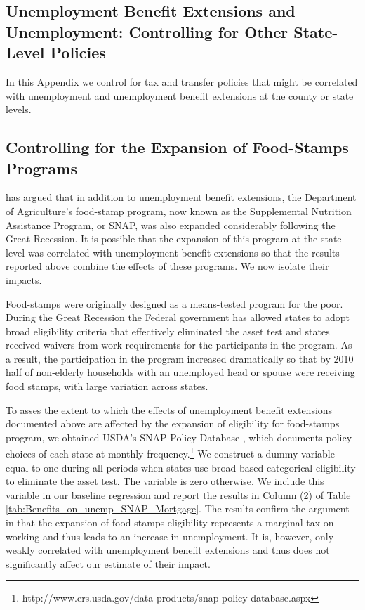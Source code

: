 \documentclass[12pt]{article}
\newcommand{\1}{\mathbf{1}}
\begin{document}
\begin{appendix}
\FloatBarrier

\section{Unemployment Benefit Extensions and Unemployment: Controlling for Other State-Level Policies}
\label{app:benefits_and_unemployment_state_policies}

In this Appendix we control for tax and transfer policies that might be correlated with unemployment and unemployment benefit extensions at the county or state levels.


\subsection{Controlling for the Expansion of Food-Stamps Programs}


\citet{mulligan:12} has argued that in addition to unemployment benefit extensions, the Department of Agriculture's food-stamp program, now known as the Supplemental Nutrition Assistance Program, or SNAP, was also expanded considerably following the Great Recession. It is possible that the expansion of this program at the state level was correlated with unemployment benefit extensions so that the results reported above combine the effects of these programs. We now isolate their impacts.

Food-stamps were originally designed as a means-tested program for the poor. During the Great Recession the Federal government has allowed states to adopt  broad eligibility criteria that effectively eliminated the asset test and states received waivers from work requirements for the participants in the program. As a result, the participation in the program increased dramatically so that by 2010 half of non-elderly households with an unemployed head or spouse were receiving food stamps, with large variation across states.

To asses the extent to which the effects of unemployment benefit extensions documented above are affected by the expansion of eligibility for food-stamps program, we obtained USDA's SNAP Policy Database \citep{data:usda-snap-policy}, which documents policy choices of each state at monthly frequency.\footnote{http://www.ers.usda.gov/data-products/snap-policy-database.aspx} We construct a dummy variable equal to one during all periods when states use broad-based categorical eligibility to eliminate the asset test. The variable is zero otherwise. We include this variable in our baseline regression and report the results in Column (2) of Table \ref{tab:Benefits_on_unemp_SNAP_Mortgage}. The results confirm the argument in \citet{mulligan:12} that the expansion of food-stamps eligibility represents a marginal tax on working and thus leads to an increase in unemployment. It is, however, only weakly correlated with unemployment benefit extensions and thus does not significantly affect our estimate of their impact.




\end{appendix}
\end{document}
